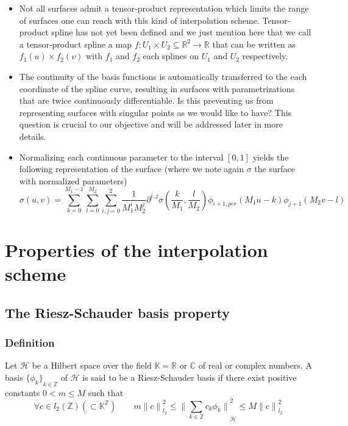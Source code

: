 \documentclass[a4paper, 11pt]{article}
\begin{document}
\begin{remark}{3}
  \begin{itemize}
    \item  Not all surfaces admit a tensor-product representation which limits the range of surfaces one can reach with 
      this kind of interpolation scheme. Tensor-product spline has not yet been defined and we just mention here  that 
      we call a tensor-product spline a map $f: U_1\times U_2 \subseteq \mathbb{R}^2 \to \mathbb{R}$ that can be written 
      as $f_1(u) \times f_2(v)$ with $f_1$ and $f_2$ each splines on $U_1$ and $U_2$ respectively.
    \item The continuity of the basis functions is automatically transferred to the each coordinate of the spline curve, 
      resulting in surfaces with parametrizations that are twice continuously differentiable. Is this preventing us from 
      representing surfaces with singular points as we would like to have? This question is crucial to our objective and 
      will be addressed later in more details.
    \item Normalizing each continuous parameter to the interval $[0,1]$ yields the following representation of the 
      surface (where we note again $\sigma$ the surface with normalized parameters)
      \begin{equation}
        \sigma(u,v) = \sum_{k=0}^{M_1-1} \sum_{l=0}^{M_2} \sum_{i,j = 0}^2 \frac{1}{M_1^i M_2^j} \partial^{i,j} 
        \sigma(\frac{k}{M_1}, \frac{l}{M_2}) \phi_{i+1, per}(M_1u-k) \phi_{j+1}(M_2v-l)
      \end{equation}
  \end{itemize}
\end{remark}

\section{Properties of the interpolation scheme}

\subsection{The Riesz-Schauder basis property}

\subsubsection{Definition}

\begin{deftn}{1}
  Let $\mathcal{H}$ be a Hilbert space over the field $\mathbb{K} = \mathbb{R}$ or $\mathbb{C}$ of real or complex 
  numbers. A basis ${\{\phi_k\}}_{k \in \mathbb{Z}}$ of $\mathcal{H}$ is said to be a Riesz-Schauder basis if there 
  exist positive constants $0 < m \leq M$ such that
  \begin{equation}
    \forall c \in l_2(\mathbb{Z}) (\subset \mathbb{K}^{\mathbb{Z}})  \qquad m {\|c\|}_{l_2}^2 \leq {\| \sum_{k \in 
    \mathbb{Z}} c_k \phi_k \|}_{\mathcal{H}}^2 \leq M {\|c\|}_{l_2}^2
  \end{equation}
\end{deftn}
\end{document}
